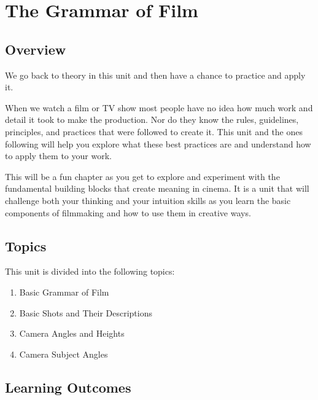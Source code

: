 \documentclass[
]{book}
\providecommand{\tightlist}{%
  \setlength{\itemsep}{0pt}\setlength{\parskip}{0pt}}
\begin{document}
\hypertarget{the-grammar-of-film}{%
\chapter{The Grammar of Film}\label{the-grammar-of-film}}

\hypertarget{overview-4}{%
\section*{Overview}\label{overview-4}}

We go back to theory in this unit and then have a chance to practice and apply it.

When we watch a film or TV show most people have no idea how much work and detail it took to make the production. Nor do they know the rules, guidelines, principles, and practices that were followed to create it. This unit and the ones following will help you explore what these best practices are and understand how to apply them to your work.

This will be a fun chapter as you get to explore and experiment with the fundamental building blocks that create meaning in cinema. It is a unit that will challenge both your thinking and your intuition skills as you learn the basic components of filmmaking and how to use them in creative ways.

\hypertarget{topics-4}{%
\section*{Topics}\label{topics-4}}

This unit is divided into the following topics:

\begin{enumerate}
\def\labelenumi{\arabic{enumi}.}
\tightlist
\item
  Basic Grammar of Film\\
\item
  Basic Shots and Their Descriptions\\
\item
  Camera Angles and Heights\\
\item
  Camera Subject Angles
\end{enumerate}

\hypertarget{learning-outcomes-4}{%
\section*{Learning Outcomes}\label{learning-outcomes-4}}
\end{document}
